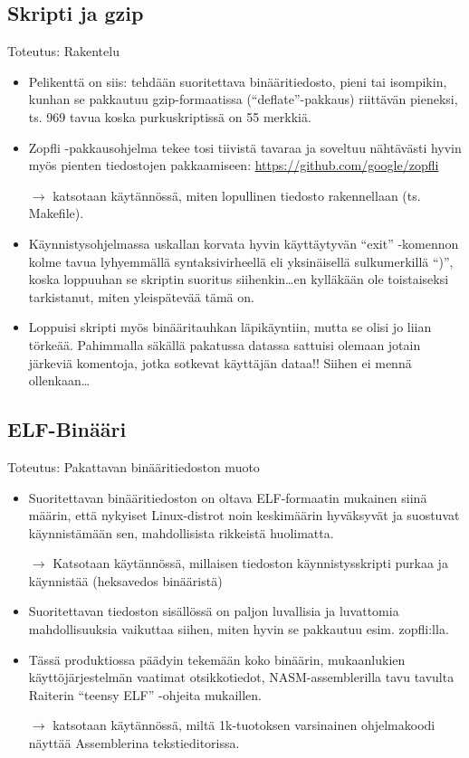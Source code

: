 \documentclass[pdf,10pt,handout]{beamer}
\begin{document}
\subsection{Skripti ja gzip}
\begin{frame}{Toteutus: Rakentelu}
  \begin{itemize}
    \item Pelikenttä on siis: tehdään suoritettava binääritiedosto,
      pieni tai isompikin, kunhan se pakkautuu gzip-formaatissa
      (``deflate''-pakkaus) riittävän pieneksi, ts. 969 tavua koska
      purkuskriptissä on 55 merkkiä.
    \item Zopfli -pakkausohjelma tekee tosi tiivistä tavaraa ja
      soveltuu nähtävästi hyvin myös pienten tiedostojen pakkaamiseen:
      \url{https://github.com/google/zopfli}
    \item[$\rightarrow$] katsotaan käytännössä, miten lopullinen
      tiedosto rakennellaan (ts. Makefile).
    \item Käynnistysohjelmassa uskallan korvata hyvin käyttäytyvän
      ``exit'' -komennon kolme tavua lyhyemmällä syntaksivirheellä eli
      yksinäisellä sulkumerkillä ``)'', koska loppuuhan se skriptin
      suoritus siihenkin\ldots en kylläkään ole toistaiseksi
      tarkistanut, miten yleispätevää tämä on.
    \item Loppuisi skripti myös binääritauhkan läpikäyntiin, mutta se
      olisi jo liian törkeää. Pahimmalla säkällä pakatussa datassa
      sattuisi olemaan jotain järkeviä komentoja, jotka sotkevat
      käyttäjän dataa!! Siihen ei mennä ollenkaan\ldots
  \end{itemize}
\end{frame}

\subsection{ELF-Binääri}
\begin{frame}{Toteutus: Pakattavan binääritiedoston muoto}
  \begin{itemize}
    \item Suoritettavan binääritiedoston on oltava ELF-formaatin
      mukainen siinä määrin, että nykyiset Linux-distrot noin
      keskimäärin hyväksyvät ja suostuvat käynnistämään sen,
      mahdollisista rikkeistä huolimatta.
    \item[$\rightarrow$] Katsotaan käytännössä, millaisen tiedoston
      käynnistysskripti purkaa ja käynnistää (heksavedos binääristä)
    \item Suoritettavan tiedoston sisällössä on paljon luvallisia ja
      luvattomia mahdollisuuksia vaikuttaa siihen, miten hyvin se
      pakkautuu esim. zopfli:lla.
    \item Tässä produktiossa päädyin tekemään koko binäärin,
      mukaanlukien käyttöjärjestelmän vaatimat otsikkotiedot,
      NASM-assemblerilla tavu tavulta Raiterin ``teensy ELF'' -ohjeita
      mukaillen.
    \item[$\rightarrow$] katsotaan käytännössä, miltä 1k-tuotoksen
      varsinainen ohjelmakoodi näyttää Assemblerina tekstieditorissa.
  \end{itemize}
\end{frame}
\end{document}
